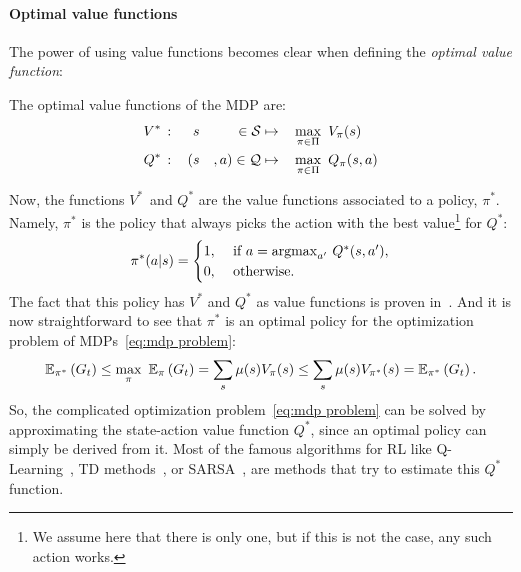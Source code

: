 			\paragraph{Optimal value functions} The power of using value functions becomes clear when defining the\emph{ optimal value function}:
			\begin{definition}
				The optimal value functions of the MDP are:
				\begin{alignat}{6}
					V^*\,&:&\,&s&\in\mathcal{S}&\mapsto& & \max_{\pi\in\Pi}~V_\pi(s) \label{eq:optimal state value}\\
					Q^*\,&:&\,(&s&, a)\in\mathcal{Q}&\mapsto& & \max_{\pi\in\Pi}~Q_\pi(s, a) \label{eq:optimal state action value}
				\end{alignat}
			\end{definition}
			Now, the functions $V^*$~and $Q^*$ are the value functions associated to a policy, $\pi^*$. Namely, $\pi^*$ is the policy that always picks the action with the best value\footnote{We assume here that there is only one, but if this is not the case, any such action works.} for $Q^*$:
			\begin{equation}
				\pi^*(a|s) = \begin{cases}
				1,&\text{ if } a = \operatorname*{argmax}_{a'}\,Q^*(s, a'),\\
				0,&\text{ otherwise}.
				\end{cases} \label{eq:optimal policy}
			\end{equation} The fact that this policy has $V^*$ and $Q^*$ as value functions is proven in~\cite[Chapter\,4]{sutton2018reinforcement}. And it is now straightforward to see that $\pi^*$ is an optimal policy for the optimization problem of MDPs~\eqref{eq:mdp problem}:
			\begin{equation*}
				\mathbb{E}_{\pi^*}\left(G_t\right) \leq \max_\pi~\mathbb{E}_\pi\left(G_t\right) = \sum_s \mu(s) V_\pi(s) \leq \sum_s \mu(s) V_{\pi^*}(s) = \mathbb{E}_{\pi^*}\left(G_t\right).
			\end{equation*}
			So, the complicated optimization problem~\eqref{eq:mdp problem} can be solved by approximating the state-action value function $Q^*$, since an optimal policy can simply be derived from it. Most of the famous algorithms for RL like Q-Learning~\cite{watkins1992q}, TD methods~\cite{sutton2018reinforcement}, or SARSA~\cite{sutton2018reinforcement}, are methods that try to estimate this $Q^*$ function.
			
